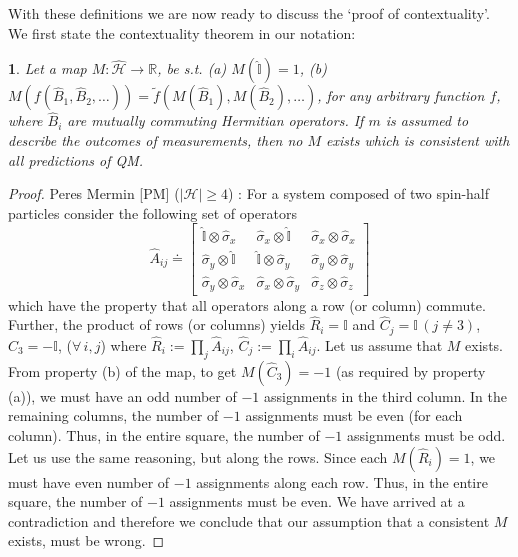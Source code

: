 \documentclass[british,aps,prl,superscriptaddress,nofootinbib,times,reprint]{revtex4-1}
\theoremstyle{plain}
\theoremstyle{plain}
\newtheorem*{thm*}{\protect\theoremname}
\theoremstyle{definition}
\theoremstyle{remark}
\theoremstyle{remark}
\theoremstyle{remark}
\theoremstyle{plain}
\theoremstyle{plain}
\theoremstyle{plain}
\theoremstyle{definition}
\theoremstyle{definition}
\providecommand{\theoremname}{Theorem}
\begin{document}
With these definitions we are now ready to discuss
the `proof of contextuality'. We first state the
contextuality theorem in our notation:
\begin{thm*} Let a map
$M:\hat{\mathcal{H}}\to\mathbb{R}$, be s.t. (a)
$M(\hat{\mathbb{I}})=1$, (b)
$M(f(\hat{B}_{1},\hat{B}_{2},\dots))=\tilde
f(M(\hat{B}_{1}),M(\hat{B}_{2}),\dots)$, for any
arbitrary function $f$, where $\hat{B}_{i}$ are
mutually commuting Hermitian operators. If $m$ is
assumed to describe the outcomes of measurements,
then no $M$ exists which is consistent with all
predictions of QM. 
\label{thm:KS}
\end{thm*}

\begin{proof} Peres Mermin [PM]
($\left|\mathcal{H}\right|\ge4$)
\cite{Peres,Mermin}:
For a system composed of two spin-half particles 
consider the following set of operators \[
\hat{A}_{ij}\doteq\left[\begin{array}{ccc}
\hat{\mathbb{I}}\otimes\hat{\sigma}_{x} &
\hat{\sigma}_{x}\otimes\hat{\mathbb{I}} &
\hat{\sigma}_{x}\otimes\hat{\sigma}_{x}\\
\hat{\sigma}_{y}\otimes\hat{\mathbb{I}} &
\hat{\mathbb{I}}\otimes\hat{\sigma}_{y} &
\hat{\sigma}_{y}\otimes\hat{\sigma}_{y}\\
\hat{\sigma}_{y}\otimes\hat{\sigma}_{x} &
\hat{\sigma}_{x}\otimes\hat{\sigma}_{y} &
\hat{\sigma}_{z}\otimes\hat{\sigma}_{z}
\end{array}\right] \] which have the property that
all operators along a row (or column) commute. Further,
the product of rows (or columns) yields
$\hat{R}_{i}=\mathbb{I}$ and
$\hat{C}_{j}=\mathbb{I}\,(j\neq3)$,
$\hat{C}_{3}=-\mathbb{I}$, ($\forall\,i,j$) where
$\hat{R}_{i}:=\prod_{j}\hat{A}_{ij}$,
$\hat{C}_{j}:=\prod_{i}\hat{A}_{ij}$. Let us
assume that $M$ exists. From property (b) of the
map, to get $M(\hat{C}_{3})=-1$ (as required by
property (a)), we must have an odd number of $-1$
assignments in the third column. In the remaining
columns, the number of $-1$ assignments must be
even (for each column). Thus, in the entire
square, the number of $-1$ assignments must be
odd. Let us use the same reasoning, but along the
rows. Since each $M(\hat{R}_{i})=1$, we must have
even number of $-1$ assignments along each row.
Thus, in the entire square, the number of $-1$
assignments must be even. We have arrived at a
contradiction and therefore we conclude that our
assumption that a consistent $M$ exists, must be
wrong.  \end{proof}
\end{document}

